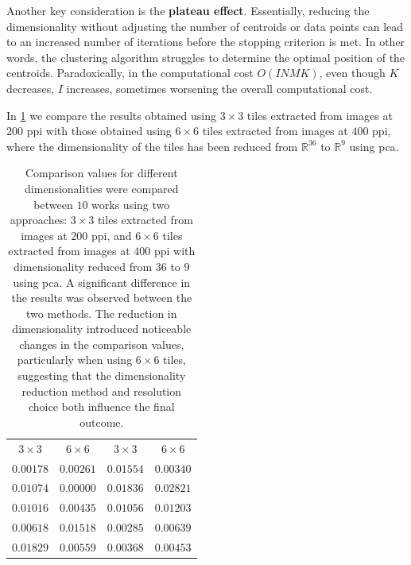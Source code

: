 \begin{toReview}
	\noindent Another key consideration is the \textbf{plateau effect}. Essentially, reducing the dimensionality without adjusting the number of centroids or data points can lead to an increased number of iterations before the stopping criterion is met. In other words, the clustering algorithm struggles to determine the optimal position of the centroids. Paradoxically, in the computational cost $O(INMK)$, even though $K$ decreases, $I$ increases, sometimes worsening the overall computational cost.

	\noindent In \cref{tab:distDimensions} we compare the results obtained using $3\times3$ tiles extracted from images at $200$ \gls{ppi} with those obtained using $6\times6$ tiles extracted from images at $400$ \gls{ppi}, where the dimensionality of the tiles has been reduced from $\mathbb{R}^{36}$ to $\mathbb{R}^9$ using \gls{pca}.

	\begin{table}[H]
		\centering
		\begin{tabular}{|c|c||c|c|}
			\hline
			\rowcolor{ambra}
			\multicolumn{4}{|c|}{size of tiles} \\
			\hline
			\rowcolor {lavender} $3\times3$ & $6\times6$ & $3\times3$ & $6\times6$ \\
			\hline
			$0.00178$ & $0.00261$ & $0.01554$ & $0.00340$ \\
			\hline
			$0.01074$ & $0.00000$ & $0.01836$ & $0.02821$ \\
			\hline
			$0.01016$ & $0.00435$ & $0.01056$ & $0.01203$ \\
			\hline
			$0.00618$ & $0.01518$ & $0.00285$ & $0.00639$ \\
			\hline
			$0.01829$ & $0.00559$ & $0.00368$ & $0.00453$ \\
			\hline
		\end{tabular}
		\caption[Comparison values for different dimensions]{Comparison values for different dimensionalities were compared between $10$ works using two approaches: $3\times3$ tiles extracted from images at $200$ \gls{ppi}, and $6\times6$ tiles extracted from images at $400$ \gls{ppi} with dimensionality reduced from $36$ to $9$ using \gls{pca}. A significant difference in the results was observed between the two methods. The reduction in dimensionality introduced noticeable changes in the comparison values, particularly when using $6\times6$ tiles, suggesting that the dimensionality reduction method and resolution choice both influence the final outcome.}
		\label{tab:distDimensions}
	\end{table}


\end{toReview}
